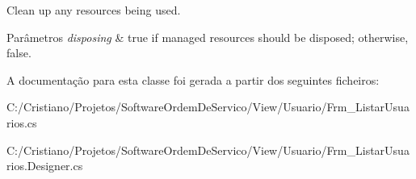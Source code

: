 Clean up any resources being used. 


\begin{DoxyParams}{Parâmetros}
{\em disposing} & true if managed resources should be disposed; otherwise, false.\\
\hline
\end{DoxyParams}


A documentação para esta classe foi gerada a partir dos seguintes ficheiros\+:\begin{DoxyCompactItemize}
\item 
C\+:/\+Cristiano/\+Projetos/\+Software\+Ordem\+De\+Servico/\+View/\+Usuario/Frm\+\_\+\+Listar\+Usuarios.\+cs\item 
C\+:/\+Cristiano/\+Projetos/\+Software\+Ordem\+De\+Servico/\+View/\+Usuario/Frm\+\_\+\+Listar\+Usuarios.\+Designer.\+cs\end{DoxyCompactItemize}
